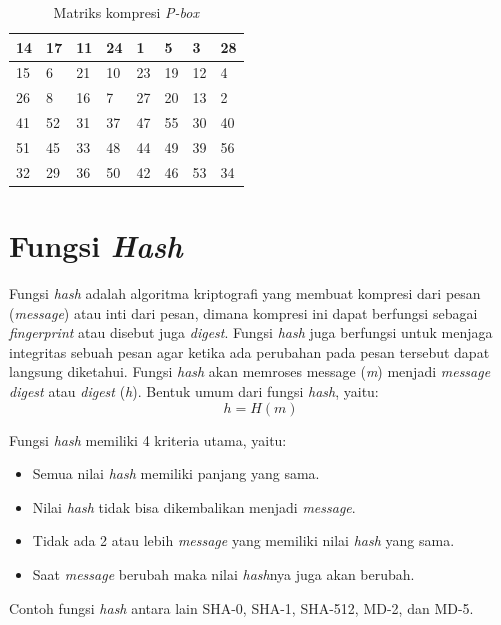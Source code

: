 \begin{table}[H]
	\begin{center}
		\begin{tabular}{|l|l|l|l|l|l|l|l|}
				\hline
				14	&	17	&	11	&	24	&	1	&	5	&	3	&	28	\\ \hline
				15	&	6	&	21	&	10	&	23	&	19	&	12	&	4	\\ \hline
				26	&	8	&	16	&	7	&	27	&	20	&	13	&	2	\\ \hline
				41	&	52	&	31	&	37	&	47	&	55	&	30	&	40	\\ \hline
				51	&	45	&	33	&	48	&	44	&	49	&	39	&	56	\\ \hline
				32	&	29	&	36	&	50	&	42	&	46	&	53	&	34	\\ \hline
		\end{tabular}
	\end{center}
	\caption{Matriks kompresi \textit{P-box}}\label{table:kompresi_p}
\end{table}


\section{Fungsi \textit{Hash}}
Fungsi \textit{hash} adalah algoritma kriptografi yang membuat kompresi dari pesan (\textit{message}) atau inti dari pesan, dimana kompresi ini dapat berfungsi sebagai \textit{fingerprint} atau disebut juga \textit{digest}. Fungsi \textit{hash} juga berfungsi untuk menjaga integritas sebuah pesan agar ketika ada perubahan pada pesan tersebut dapat langsung diketahui. Fungsi \textit{hash} akan memroses message (\textit{m}) menjadi \textit{message digest} atau \textit{digest} (\textit{h}). Bentuk umum dari fungsi \textit{hash}, yaitu:
\begin{displaymath}
	h = H(m)
\end{displaymath}

\noindent Fungsi \textit{hash} memiliki 4 kriteria utama, yaitu:
\begin{itemize}
	\item Semua nilai \textit{hash} memiliki panjang yang sama.
	\item Nilai \textit{hash} tidak bisa dikembalikan menjadi \textit{message}.
	\item Tidak ada 2 atau lebih \textit{message} yang memiliki nilai \textit{hash} yang sama.
	\item Saat \textit{message} berubah maka nilai \textit{hash}nya juga akan berubah.
\end{itemize}
Contoh fungsi \textit{hash} antara lain SHA-0, SHA-1, SHA-512, MD-2, dan MD-5.

